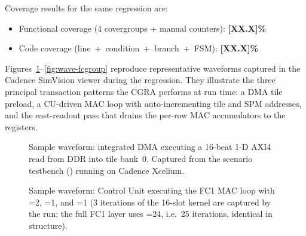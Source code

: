 Coverage results for the same regression are:
\begin{itemize}[leftmargin=1.4cm,itemsep=2pt,topsep=2pt]
\item Functional coverage (4 covergroups + manual counters):
\textbf{[XX.X]\%}
\item Code coverage (line~+~condition~+~branch~+~FSM):
\textbf{[XX.X]\%}
\end{itemize}

Figures~\ref{fig:wave-dma}--\ref{fig:wave-fcgroup} reproduce
representative waveforms captured in the Cadence SimVision viewer
during the regression. They illustrate the three principal
transaction patterns the CGRA performs at run time: a DMA tile
preload, a CU-driven MAC loop with auto-incrementing tile and SPM
addresses, and the east-readout pass that drains the per-row MAC
accumulators to the  registers.

\begin{figure}[!htbp]
\centering
{}
\caption{Sample waveform: integrated DMA executing a 16-beat 1-D
AXI4 read from DDR into tile bank~0. Captured from the
 scenario testbench
() running on Cadence Xcelium.}
\label{fig:wave-dma}
\end{figure}

\begin{figure}[!htbp]
\centering
{}
\caption{Sample waveform: Control Unit executing the FC1 MAC loop
with =2, =1, and
=1 (3 iterations of the 16-slot kernel are
captured by the  run; the full FC1 layer
uses =24, i.e.\ 25 iterations, identical in
structure).}
\label{fig:wave-cuMAC}
\end{figure}

